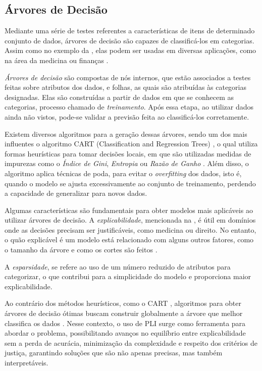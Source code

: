 \documentclass[12pt,a4paper]{article}
\begin{document}
\subsection{Árvores de Decisão}

Mediante uma série de testes referentes a características de itens de
determinado conjunto de dados, árvores de decisão são capazes de classificá-los
em categorias. Assim como no exemplo da , elas podem ser
usadas em diversas aplicações, como na área da medicina \cite{Richards2001, Freitas2014}
ou finanças \cite{Dhar2000}.

\emph{Árvores de decisão} são compostas de nós internos, que estão associados a testes
feitas sobre atributos dos dados, e folhas, as quais são atribuídas às categorias
designadas. Elas são construídas a partir de dados em que se conhecem as categorias,
processo chamado de \textit{treinamento}. Após essa etapa, ao utilizar dados ainda não vistos,
pode-se validar a previsão feita ao classificá-los corretamente.

Existem diversos algoritmos para a geração dessas árvores, sendo um dos mais
influentes o algoritmo CART (Classification and Regression Trees) \cite{Breiman2017},
o qual utiliza formas heurísticas para tomar decisões locais, em que são utilizadas medidas de impurezas
como o \textit{Índice de Gini}, \textit{Entropia} ou \textit{Razão de Ganho} \cite{Demirovic2020}. Além disso, o algoritmo aplica técnicas de poda, para evitar o \textit{overfitting} dos dados,
isto é, quando o modelo se ajusta excessivamente ao conjunto de treinamento, perdendo a capacidade
de generalizar para novos dados.

Algumas características são fundamentais para obter modelos mais aplicáveis ao utilizar
árvores de decisão. A \emph{explicabilidade}, mencionada na , é útil em
domínios onde as decisões precisam ser justificáveis, como medicina ou direito. No entanto,
o quão explicável é um modelo está relacionado com alguns outros fatores, como o tamanho
da árvore e como os cortes são feitos \cite{Costa2022}. 

A \emph{esparsidade}, se refere ao uso de um número reduzido de atributos para
categorizar, o que contribui para a simplicidade do modelo e proporciona maior
explicabilidade.

Ao contrário dos métodos heurísticos, como o CART \cite{Breiman2017},
algoritmos para obter árvores de decisão ótimas buscam construir globalmente a árvore que melhor classifica os dados \cite{Bertsimas2017}.
Nesse contexto, o uso de PLI surge como ferramenta para abordar o problema, possibilitando avanços no
equilíbrio entre explicabilidade sem a perda de acurácia, minimização da complexidade
e respeito dos critérios de justiça, garantindo soluções que são não apenas precisas,
mas também interpretáveis.
\end{document}

